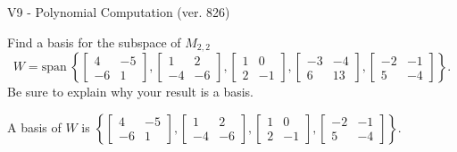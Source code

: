 \begin{exercise}
  \begin{exerciseTitle}V9 - Polynomial Computation (ver. 826)\end{exerciseTitle}
  \begin{exerciseStatement}
    Find a basis for the subspace of \(M_{2,2}\) 
\[W=\mathrm{span}\ \left\{\left[\begin{array}{cc}
4 & -5 \\
-6 & 1
\end{array}\right] , \left[\begin{array}{cc}
1 & 2 \\
-4 & -6
\end{array}\right] , \left[\begin{array}{cc}
1 & 0 \\
2 & -1
\end{array}\right] , \left[\begin{array}{cc}
-3 & -4 \\
6 & 13
\end{array}\right] , \left[\begin{array}{cc}
-2 & -1 \\
5 & -4
\end{array}\right]\right\}.\]
 Be sure to explain why your result is a basis.


  \end{exerciseStatement}
  \begin{exerciseAnswer}
   A basis of \(W\) is  \(\left\{\left[\begin{array}{cc}
4 & -5 \\
-6 & 1
\end{array}\right] , \left[\begin{array}{cc}
1 & 2 \\
-4 & -6
\end{array}\right] , \left[\begin{array}{cc}
1 & 0 \\
2 & -1
\end{array}\right] , \left[\begin{array}{cc}
-2 & -1 \\
5 & -4
\end{array}\right]\right\}\).
  


  \end{exerciseAnswer}
\end{exercise}